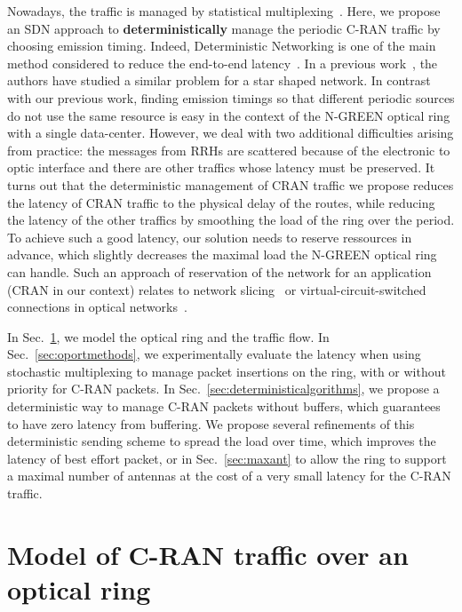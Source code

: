 \documentclass[10pt, conference, letterpaper]{IEEEtran}
\begin{document}
Nowadays, the traffic is managed by statistical multiplexing~\cite{kern2006applying}. Here, we propose an SDN approach to {\bf deterministically} manage the periodic C-RAN traffic by choosing emission timing. Indeed, Deterministic Networking is one of the main method considered to reduce the end-to-end latency~\cite{finn-detnet-architecture-08}. In a previous work~\cite{dominique2018deterministic}, the authors have studied a similar problem for a star shaped network. In contrast with our previous work, finding emission timings so that different periodic sources do not use the same resource is easy in the context of the N-GREEN optical ring with a single data-center. However, we deal with two additional difficulties arising from practice: the messages from RRHs are scattered because of the electronic to optic interface and there are other traffics whose latency must be preserved. It turns out that the deterministic management of CRAN traffic we propose reduces the latency of CRAN traffic to the physical delay of the routes, while reducing the latency of the other traffics by smoothing the load of the ring over the period. To achieve such a good latency, our solution needs to reserve ressources in advance, which slightly decreases the maximal load the N-GREEN optical ring can handle. Such an approach of reservation of the network for an application (CRAN in our context) relates to network slicing~\cite{jiang2016network} or virtual-circuit-switched connections in optical networks~\cite{cadere2010virtual,szymanski2016ultra}.

In Sec.~\ref{sec:model}, we model the optical ring and the traffic flow. In Sec.~\ref{sec:oportmethods}, we experimentally evaluate the latency when using stochastic multiplexing to manage packet insertions on the ring, with or without priority for C-RAN packets. In Sec.~\ref{sec:deterministicalgorithms}, we propose a deterministic way to manage C-RAN packets without buffers, which guarantees to have zero latency from buffering. We propose several refinements of this deterministic sending scheme to spread the load over time, which improves the latency of best effort packet, or in Sec.~\ref{sec:maxant} to allow the ring to support a maximal number of antennas at the cost of a very small latency for the C-RAN traffic. 

\section{Model of C-RAN traffic over an optical ring}
\label{sec:model}
    
\end{document}
